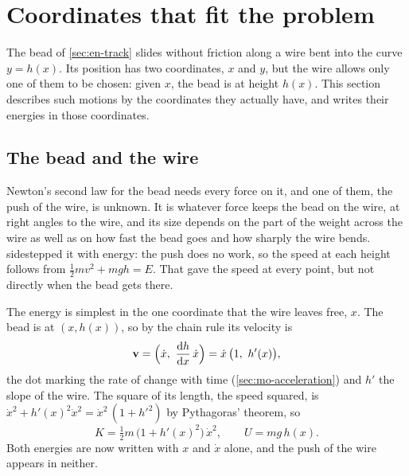 \section{Coordinates that fit the problem}
\label{sec:la-coordinates}

The bead of \cref{sec:en-track} slides without friction along a wire bent
into the curve $y = h(x)$. Its position has two coordinates, $x$ and $y$,
but the wire allows only one of them to be chosen: given $x$, the bead is
at height $h(x)$. This section describes such motions by the coordinates
they actually have, and writes their energies in those coordinates.

\subsection*{The bead and the wire}

Newton's second law for the bead needs every force on it, and one of them,
the push of the wire, is unknown. It is whatever force keeps the bead on
the wire, at right angles to the wire, and its size depends on the part
of the weight across the wire as well as on how fast the bead goes and how
sharply the wire bends. 
sidestepped it with energy: the push does no work, so the speed at each
height follows from $\frac12 mv^2 + mgh = E$. That gave the speed at every
point, but not directly when the bead gets there.

The energy is simplest in the one coordinate that the wire leaves free,
$x$. The bead is at $(x, h(x))$, so by the chain rule its velocity is
\begin{equation*}
   \bm{\mathrm{v}} = \Bigl(\dot{x},\ \frac{\mathrm{d} h}{\mathrm{d} x}\,\dot{x}\Bigr)
   = \dot{x}\,\bigl(1,\ h'(x)\bigr) ,
\end{equation*}
the dot marking the rate of change with time (\cref{sec:mo-acceleration})
and $h'$ the slope of the wire. The square of its length, the speed
squared, is $\dot{x}^2 + h'(x)^2\dot{x}^2 = \dot{x}^2\,(1 + h'^2)$ by
Pythagoras' theorem, so
\begin{equation*}
   K = \tfrac12 m\,\bigl(1 + h'(x)^2\bigr)\,\dot{x}^2 ,
   \qquad U = mg\,h(x) .
\end{equation*}
Both energies are now written with $x$ and $\dot{x}$ alone, and the push
of the wire appears in neither.

